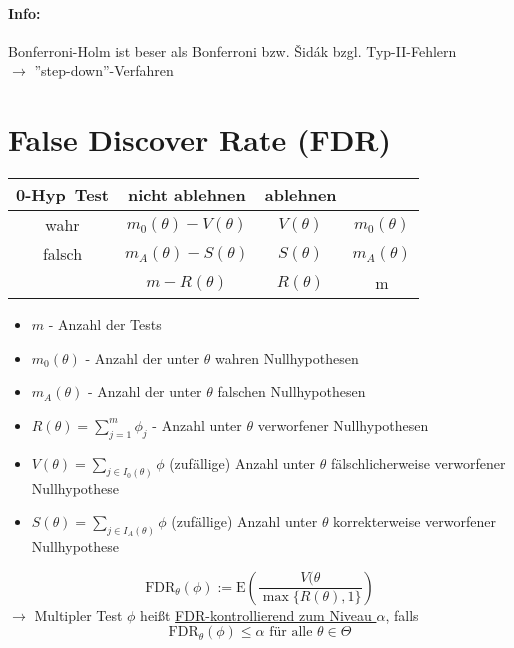 \paragraph{Info:}
Bonferroni-Holm ist beser als Bonferroni bzw. \v Sid\'ak bzgl. Typ-II-Fehlern\\
$\rightarrow$ ''step-down''-Verfahren

\section{False Discover Rate (FDR) }
\begin{tabular}{c|c|c|c}
0-Hyp\ Test & nicht ablehnen & ablehnen & \\ \hline
wahr & \cellcolor{yellow!25} $m_0 (\theta) - V(\theta)$ & \cellcolor{yellow!25}$V(\theta)$ & \cellcolor{yellow!25}$m_0(\theta)$\\ \hline
falsch &\cellcolor{yellow!25}$m_A (\theta) - S(\theta)$  &\cellcolor{yellow!25} $S(\theta)$ &\cellcolor{yellow!25} $m_A(\theta)$\\ \hline
& \cellcolor{red!25}$m-R(\theta)$ & \cellcolor{red!25}$R(\theta)$ & m\\
\end{tabular}

\begin{itemize}
 \item $m$ - Anzahl der Tests \\
 \item $m_0 (\theta)$ - Anzahl der unter $\theta$ wahren Nullhypothesen \\
 \item $m_A (\theta)$ - Anzahl der unter $\theta$ falschen Nullhypothesen \\
 \item $R(\theta) = \sum\limits_{j=1}^m \phi_j$ - Anzahl unter $\theta$ verworfener Nullhypothesen
 \item $V(\theta) = \sum\limits_{j \in I_0(\theta)} \phi $ (zufällige) Anzahl unter $\theta$ fälschlicherweise verworfener Nullhypothese 
 \item $S(\theta) = \sum\limits_{j \in I_A(\theta)} \phi $ (zufällige) Anzahl unter $\theta$ korrekterweise verworfener Nullhypothese 
\end{itemize}

\[ \text{FDR}_{\theta}(\phi) := \text{E} \left( \frac{V(\theta}{\max\{R(\theta),1\}}\right) \]
$\rightarrow$ Multipler Test $\phi$ heißt \underline{FDR-kontrollierend zum Niveau $\alpha$}, falls
\[ \text{FDR}_{\theta}(\phi) \leq \alpha \text{ für alle } \theta \in \Theta \]

